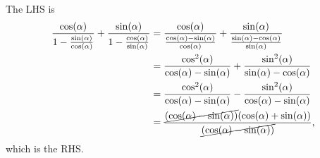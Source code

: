 \begin{parts}
\begin{EnvFullwidth}
\begin{solutionorgrid}[3.25in]
The LHS is
\begin{align*}
    \frac{\cos(\alpha)}{1 - \frac{\sin(\alpha)}{\cos(\alpha)}} + \frac{\sin(\alpha)}{1 - \frac{\cos(\alpha)}{\sin(\alpha)}}
    &=
    \frac{\cos(\alpha)}{\frac{\cos(\alpha) - \sin(\alpha)}{\cos(\alpha)}} + \frac{\sin(\alpha)}{\frac{\sin(\alpha) - \cos(\alpha)}{\sin(\alpha)}} \\
    &=
    \frac{\cos^2(\alpha)}{\cos(\alpha) - \sin(\alpha)} + \frac{\sin^2(\alpha)}{\sin(\alpha) - \cos(\alpha)} \\
    &=
    \frac{\cos^2(\alpha)}{\cos(\alpha) - \sin(\alpha)} - \frac{\sin^2(\alpha)}{\cos(\alpha) - \sin(\alpha)} \\
    &=
    \frac{\cancel{(\cos(\alpha) - \sin(\alpha))}(\cos(\alpha) + \sin(\alpha))}{\cancel{(\cos(\alpha) - \sin(\alpha))}},
\end{align*}
which is the RHS.
\end{solutionorgrid}
\end{EnvFullwidth}

\end{parts}
